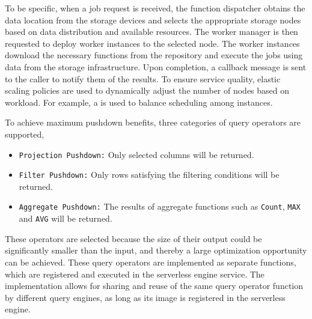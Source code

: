To be specific, when a job request is received, the function dispatcher obtains the data location from the storage devices and selects the appropriate storage nodes based on data distribution and available resources. The worker manager is then requested to deploy worker instances to the selected node. The worker instances download the necessary functions from the repository and execute the jobs using data from the storage infrastructure. Upon completion, a callback message is sent to the caller to notify them of the results. To ensure service quality, elastic scaling policies are used to dynamically adjust the number of nodes based on workload. 
For example, a  is used to balance scheduling among instances.


To achieve maximum pushdown benefits, three categories of query operators are supported, 

\begin{itemize}

\item \texttt{Projection Pushdown:}  Only selected columns will be returned.

\item \texttt{Filter Pushdown:} Only rows satisfying the filtering conditions will be returned.

\item \texttt{Aggregate  Pushdown:} The results of aggregate functions such as \texttt{Count}, \texttt{MAX} and \texttt{AVG} will be returned.

\end{itemize}

These operators are selected because the size of their output could be significantly smaller than the input, and thereby a large optimization opportunity can be achieved.
These query operators are implemented as separate functions, which are registered and executed in the serverless engine service. The implementation allows for sharing and reuse of the same query operator function by different query engines, as long as its image is registered in the serverless engine.



